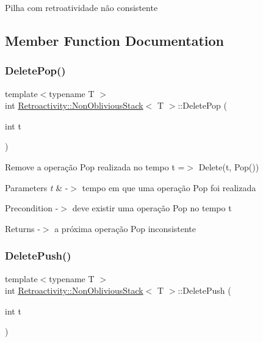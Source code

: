 Pilha com retroatividade não consistente 

\subsection{Member Function Documentation}
\mbox{\label{classRetroactivity_1_1NonObliviousStack_ab50e11a16a4c8ed79b305e6e6d33cdd9}} 
\subsubsection{\texorpdfstring{Delete\+Pop()}{DeletePop()}}
{\footnotesize\ttfamily template$<$typename T $>$ \\
int \hyperlink{classRetroactivity_1_1NonObliviousStack}{Retroactivity\+::\+Non\+Oblivious\+Stack}$<$ T $>$\+::Delete\+Pop (\begin{DoxyParamCaption}\item[{int}]{t }\end{DoxyParamCaption})}

Remove a operação Pop realizada no tempo t =$>$ Delete(t, Pop())


\begin{DoxyParams}{Parameters}
{\em t} & -\/$>$ tempo em que uma operação Pop foi realizada \\
\hline
\end{DoxyParams}
\begin{DoxyPrecond}{Precondition}
-\/$>$ deve existir uma operação Pop no tempo t 
\end{DoxyPrecond}
\begin{DoxyReturn}{Returns}
-\/$>$ a próxima operação Pop inconsistente 
\end{DoxyReturn}
\mbox{\label{classRetroactivity_1_1NonObliviousStack_a8b35e4694da19ceb5cfe86b692f22fee}} 
\subsubsection{\texorpdfstring{Delete\+Push()}{DeletePush()}}
{\footnotesize\ttfamily template$<$typename T $>$ \\
int \hyperlink{classRetroactivity_1_1NonObliviousStack}{Retroactivity\+::\+Non\+Oblivious\+Stack}$<$ T $>$\+::Delete\+Push (\begin{DoxyParamCaption}\item[{int}]{t }\end{DoxyParamCaption})}

